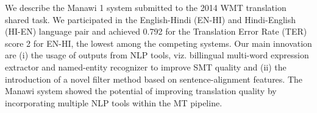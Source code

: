 We describe the Manawi 1 system submitted to the 2014 WMT translation shared task. We participated in the English-Hindi (EN-HI) and Hindi-English (HI-EN) language pair and achieved 0.792 for the Translation Error Rate (TER) score 2 for EN-HI, the lowest among the competing systems. Our main innovation are (i) the usage of outputs from NLP tools, viz. billingual multi-word expression extractor and named-entity recognizer to improve SMT quality and (ii) the introduction of a novel filter method based on sentence-alignment features. The Manawi system showed the potential of improving translation quality by incorporating multiple NLP tools within the MT pipeline.
